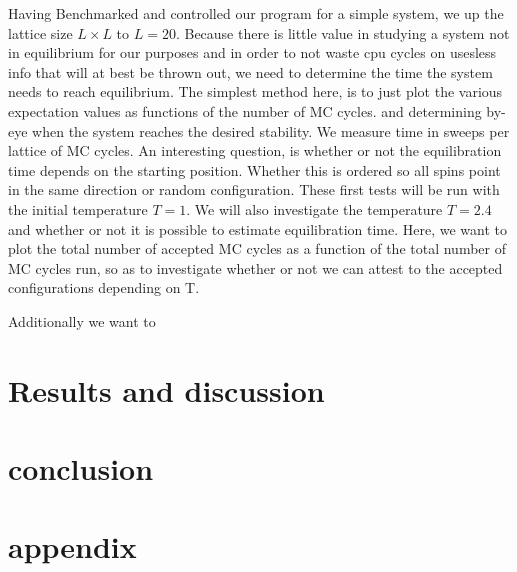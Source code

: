 \documentclass[10pt, twocolumn]{revtex4-1}
\begin{document}
Having Benchmarked and controlled our program for a simple system, we up the lattice size $L\times L$ to $L=20$. Because there is little value in studying 
a system not in equilibrium for our purposes and in order to not waste cpu cycles on usesless info that will at best be thrown out, we need to determine the
time the system needs to reach equilibrium. The simplest method here, is to just plot the various expectation values as functions of the number of MC cycles.
and determining by-eye when the system reaches the desired stability. We measure time in sweeps per lattice of MC cycles. An interesting question, is whether
or not the equilibration time depends on the starting position. Whether this is ordered so all spins point in the same direction or random configuration.
These first tests will be run with the initial temperature $T=1$. We will also investigate the temperature $T = 2.4$ and whether or not it is possible to 
estimate equilibration time. Here, we want to plot the total number of accepted MC cycles as a function of the total number of MC cycles run, so as to 
investigate whether or not we can attest to the accepted configurations depending on T. 

Additionally we want to 


\section{Results and discussion}

\section{conclusion}

\section{appendix}



\end{document}
